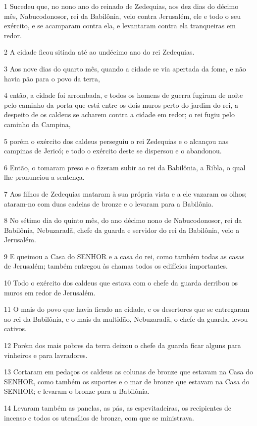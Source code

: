 \par 1 Sucedeu que, no nono ano do reinado de Zedequias, aos dez dias do décimo mês, Nabucodonosor, rei da Babilônia, veio contra Jerusalém, ele e todo o seu exército, e se acamparam contra ela, e levantaram contra ela tranqueiras em redor.
\par 2 A cidade ficou sitiada até ao undécimo ano do rei Zedequias.
\par 3 Aos nove dias do quarto mês, quando a cidade se via apertada da fome, e não havia pão para o povo da terra,
\par 4 então, a cidade foi arrombada, e todos os homens de guerra fugiram de noite pelo caminho da porta que está entre os dois muros perto do jardim do rei, a despeito de os caldeus se acharem contra a cidade em redor; o rei fugiu pelo caminho da Campina,
\par 5 porém o exército dos caldeus perseguiu o rei Zedequias e o alcançou nas campinas de Jericó; e todo o exército deste se dispersou e o abandonou.
\par 6 Então, o tomaram preso e o fizeram subir ao rei da Babilônia, a Ribla, o qual lhe pronunciou a sentença.
\par 7 Aos filhos de Zedequias mataram à sua própria vista e a ele vazaram os olhos; ataram-no com duas cadeias de bronze e o levaram para a Babilônia.
\par 8 No sétimo dia do quinto mês, do ano décimo nono de Nabucodonosor, rei da Babilônia, Nebuzaradã, chefe da guarda e servidor do rei da Babilônia, veio a Jerusalém.
\par 9 E queimou a Casa do SENHOR e a casa do rei, como também todas as casas de Jerusalém; também entregou às chamas todos os edifícios importantes.
\par 10 Todo o exército dos caldeus que estava com o chefe da guarda derribou os muros em redor de Jerusalém.
\par 11 O mais do povo que havia ficado na cidade, e os desertores que se entregaram ao rei da Babilônia, e o mais da multidão, Nebuzaradã, o chefe da guarda, levou cativos.
\par 12 Porém dos mais pobres da terra deixou o chefe da guarda ficar alguns para vinheiros e para lavradores.
\par 13 Cortaram em pedaços os caldeus as colunas de bronze que estavam na Casa do SENHOR, como também os suportes e o mar de bronze que estavam na Casa do SENHOR; e levaram o bronze para a Babilônia.
\par 14 Levaram também as panelas, as pás, as espevitadeiras, os recipientes de incenso e todos os utensílios de bronze, com que se ministrava.
